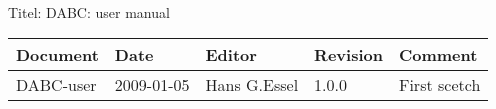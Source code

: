 \\Titel: DABC: user manual
\begin{table}[h]
\begin{tabular}{|p{2.8cm}|p{2.0cm}|p{3.0cm}|p{1.6cm}|p{5.0cm}|} \hline
Document   & Date        & Editor       & Revision & Comment \\
\hline DABC-user & 2009-01-05 & Hans G.Essel & 1.0.0      &
First scetch \\ \hline
\end{tabular}
\end{table}
